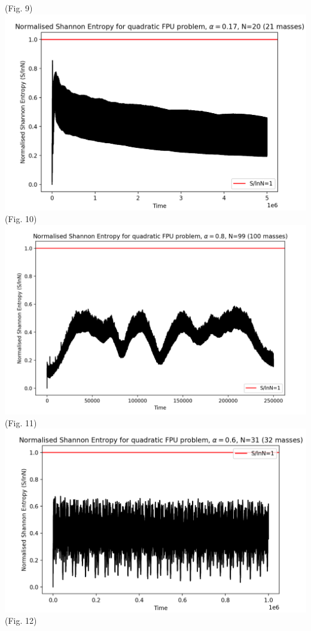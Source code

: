 \documentclass{article}
\begin{document}
\begin{center}
    (Fig. 9)\\
    \includegraphics[scale=.5]{SEN20LT.png}\\ 
    (Fig. 10)\\
    \includegraphics[scale=.45]{SEN100.png}\\ 
    (Fig. 11)\\ 
    \includegraphics[scale=.5]{SEN32.png}\\ 
    (Fig. 12)
\end{center} 
\end{document}
